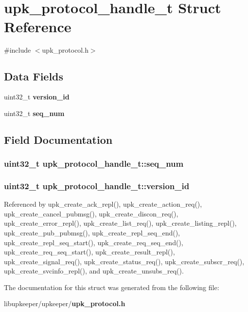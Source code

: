\section{upk\_\-protocol\_\-handle\_\-t Struct Reference}
\label{structupk__protocol__handle__t}


{\ttfamily \#include $<$upk\_\-protocol.h$>$}

\subsection*{Data Fields}
\begin{DoxyCompactItemize}
\item 
uint32\_\-t {\bf version\_\-id}
\item 
uint32\_\-t {\bf seq\_\-num}
\end{DoxyCompactItemize}


\subsection{Field Documentation}
\subsubsection[{seq\_\-num}]{\setlength{\rightskip}{0pt plus 5cm}uint32\_\-t {\bf upk\_\-protocol\_\-handle\_\-t::seq\_\-num}}\label{structupk__protocol__handle__t_a3e5058c9aea789425b48c119cde51df3}
\subsubsection[{version\_\-id}]{\setlength{\rightskip}{0pt plus 5cm}uint32\_\-t {\bf upk\_\-protocol\_\-handle\_\-t::version\_\-id}}\label{structupk__protocol__handle__t_ac291fc1a2e533932f8f96acab2089cff}


Referenced by upk\_\-create\_\-ack\_\-repl(), upk\_\-create\_\-action\_\-req(), upk\_\-create\_\-cancel\_\-pubmsg(), upk\_\-create\_\-discon\_\-req(), upk\_\-create\_\-error\_\-repl(), upk\_\-create\_\-list\_\-req(), upk\_\-create\_\-listing\_\-repl(), upk\_\-create\_\-pub\_\-pubmsg(), upk\_\-create\_\-repl\_\-seq\_\-end(), upk\_\-create\_\-repl\_\-seq\_\-start(), upk\_\-create\_\-req\_\-seq\_\-end(), upk\_\-create\_\-req\_\-seq\_\-start(), upk\_\-create\_\-result\_\-repl(), upk\_\-create\_\-signal\_\-req(), upk\_\-create\_\-status\_\-req(), upk\_\-create\_\-subscr\_\-req(), upk\_\-create\_\-svcinfo\_\-repl(), and upk\_\-create\_\-unsubs\_\-req().



The documentation for this struct was generated from the following file:\begin{DoxyCompactItemize}
\item 
libupkeeper/upkeeper/{\bf upk\_\-protocol.h}\end{DoxyCompactItemize}
